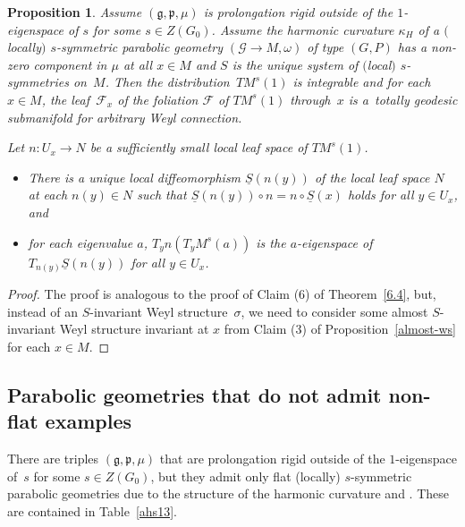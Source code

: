 \documentclass[pdftex]{sigma}
\newcommand{\om}{\omega}
\newcommand{\si}{\sigma}
\newcommand{\un}{\underline}
\newcommand{\ba}{\mathcal{G}}
\newcommand{\fg}{\mathfrak g}
\newcommand{\fp}{\mathfrak p}
\numberwithin{equation}{section}
\newtheorem{Proposition}[Theorem]{Proposition}
 { \theoremstyle{definition}
\newtheorem{Definition}[Theorem]{Definition}
\newtheorem{Example}[Theorem]{Example}
\newtheorem{Remark}[Theorem]{Remark} }
\begin{document}
\begin{Proposition}\label{6.6}
Assume $(\fg,\fp,\mu)$ is prolongation rigid outside of the $1$-eigenspace of $s$ for some $s\in Z(G_0)$. Assume the harmonic curvature $\kappa_H$ of a $($locally$)$ $s$-symmetric parabolic geo\-met\-ry $(\ba\to M,\om)$ of type $(G,P)$ has a non-zero component in $\mu$ at all $x\in M$ and $S$ is the unique system of $($local$)$ $s$-symmetries on~$M$. Then the distribution~$TM^s(1)$ is integrable and for each $x \in M$, the leaf~$\mathcal{F}_x$ of the foliation $\mathcal{F}$ of $TM^s(1)$ through~$x$ is a~totally geodesic submanifold for arbitrary Weyl connection.

Let $n\colon U_x\to N$ be a sufficiently small local leaf space of $TM^s(1)$.
\begin{itemize}\itemsep=0pt
\item There is a unique local diffeomorphism $\un S(n(y))$ of the local leaf space $N$ at each $n(y)\in N$ such that $\un S(n(y))\circ n=n\circ \un S(x)$ holds for all $y\in U_x$, and
\item for each eigenvalue $a$, $T_yn(T_yM^s(a))$ is the $a$-eigenspace of $T_{n(y)}\un S(n(y))$ for all $y\in U_x$.
\end{itemize}
\end{Proposition}
\begin{proof}
The proof is analogous to the proof of Claim (6) of Theorem~\ref{6.4}, but, instead of an $S$-invariant Weyl structure~$\si$, we need to consider some almost $S$-invariant Weyl structure invariant at $x$ from Claim (3) of Proposition~\ref{almost-ws} for each $x\in M$.
\end{proof}

\subsection{Parabolic geometries that do not admit non-f\/lat examples}

There are triples $(\fg,\fp,\mu)$ that are prolongation rigid outside of the $1$-eigenspace of~$s$ for some $s\in Z(G_0)$, but they admit only f\/lat (locally) $s$-symmetric parabolic geometries due to the structure of the harmonic curvature and \cite[Lemma~2.2]{GZ2}. These are contained in Table~\ref{ahs13}.
\end{document}

